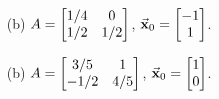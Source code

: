 \begin{exercises}
\begin{exercise}
\begin{enumerate}
\item[(b)]
$\displaystyle A  =  \begin{bmatrix}
              1/4 & 0 \\
              1/2 & 1/2
           \end{bmatrix}$, \hspace*{.25cm}
$\displaystyle \vec{\textbf{x}}_0 = \begin{bmatrix} -1 \\ 1 \end{bmatrix}$.
\item[(b)]
$\displaystyle A  =  \begin{bmatrix}
              3/5 & 1 \\
              -1/2 & 4/5
           \end{bmatrix}$, \hspace*{.25cm} 
$\displaystyle \vec{\textbf{x}}_0 = \begin{bmatrix} 1 \\ 0 \end{bmatrix}$.
\end{enumerate}
\end{exercise}


\end{exercises}
